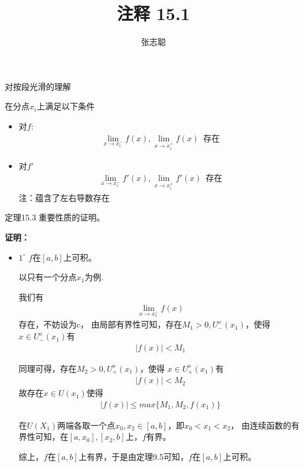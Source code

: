\documentclass{article}
\begin{document}
\title{注释 15.1}
\author{张志聪}
\maketitle

\begin{zremark}
  对按段光滑的理解
\end{zremark}
在分点$x_i$上满足以下条件
\begin{itemize}
  \item 对$f$:
        \begin{align*}
          \lim\limits_{x \to x_i^{-}} f(x), \lim\limits_{x \to x_i^+} f(x) \,\,\, \text{存在}
        \end{align*}

  \item 对$f'$
        \begin{align*}
          \lim\limits_{x \to x_i^{-}} f'(x), \lim\limits_{x \to x_i^+} f'(x) \,\,\, \text{存在}
        \end{align*}
        注：蕴含了左右导数存在
\end{itemize}

\begin{zremark}
  定理15.3 重要性质的证明。
\end{zremark}
\textbf{证明：}

\begin{itemize}
  \item $1^{\circ}$ $f$在$[a, b]$上可积。

        以只有一个分点$x_1$为例.

        我们有
        \begin{align*}
          \lim\limits_{x \to x_1^{-}} f(x)
        \end{align*}
        存在，不妨设为$c$，
        由局部有界性可知，存在$M_1 > 0, U_{-}^{o}(x_1)$，使得
        $x \in U_{-}^{o}(x_1)$有
        \begin{align*}
          |f(x)| < M_1
        \end{align*}

        同理可得，存在$M_2 > 0, U_{+}^{o}(x_1)$，使得
        $x \in U_{+}^{o}(x_1)$有
        \begin{align*}
          |f(x)| < M_2
        \end{align*}
        故存在$x \in U(x_1)$使得
        \begin{align*}
          |f(x)| \leq max\{M_1, M_2, f(x_1)\}
        \end{align*}

        在$U(X_1)$两端各取一个点$x_0, x_2 \in [a, b]$，即$x_0 < x_1 < x_2$，
        由连续函数的有界性可知，在$[a, x_0], [x_2, b]$上，$f$有界。

        综上，$f$在$[a, b]$上有界，于是由定理9.5可知，$f$在$[a, b]$上可积。

\end{itemize}
\end{document}
